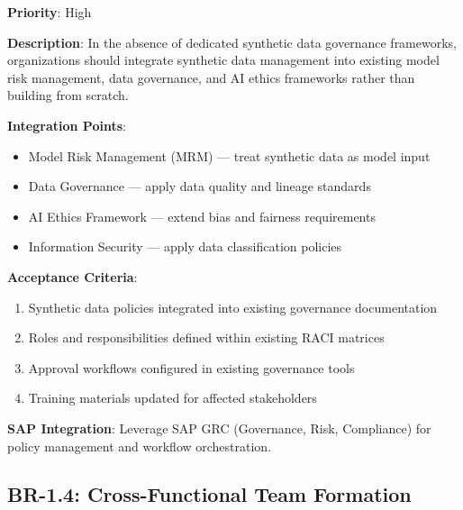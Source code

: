 \begin{tcolorbox}[colback=blue!5,colframe=blue!70,title=BR-1.3: Existing Governance Framework Integration]
\textbf{Priority}: High

\textbf{Description}: In the absence of dedicated synthetic data governance
frameworks, organizations should integrate synthetic data management into existing
model risk management, data governance, and AI ethics frameworks rather than
building from scratch.

\textbf{Integration Points}:
\begin{itemize}
  \item Model Risk Management (MRM) --- treat synthetic data as model input
  \item Data Governance --- apply data quality and lineage standards
  \item AI Ethics Framework --- extend bias and fairness requirements
  \item Information Security --- apply data classification policies
\end{itemize}

\textbf{Acceptance Criteria}:
\begin{enumerate}
  \item Synthetic data policies integrated into existing governance documentation
  \item Roles and responsibilities defined within existing RACI matrices
  \item Approval workflows configured in existing governance tools
  \item Training materials updated for affected stakeholders
\end{enumerate}

\textbf{SAP Integration}: Leverage SAP GRC (Governance, Risk, Compliance) for
policy management and workflow orchestration.
\end{tcolorbox}

\subsection{BR-1.4: Cross-Functional Team Formation}

